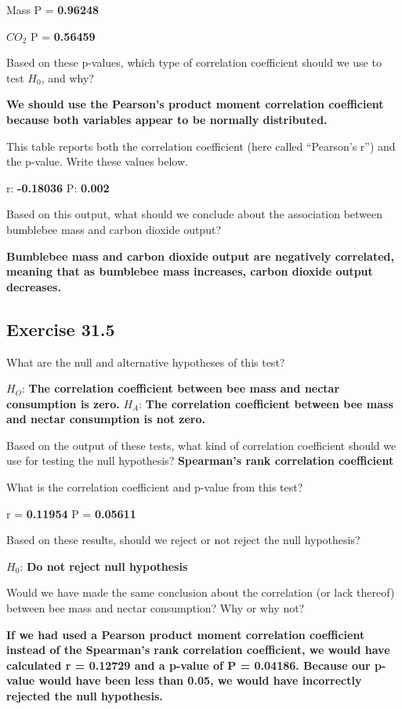 \documentclass[
  openany]{krantz}
\begin{document}
Mass P = \textbf{0.96248}

\(CO_2\) P = \textbf{0.56459}

Based on these p-values, which type of correlation coefficient should we use to test \(H_{0}\), and why?

\textbf{We should use the Pearson's product moment correlation coefficient because both variables appear to be normally distributed.}

This table reports both the correlation coefficient (here called ``Pearson's r'') and the p-value. Write these values below.

r: \textbf{-0.18036}
P: \textbf{0.002}

Based on this output, what should we conclude about the association between bumblebee mass and carbon dioxide output?

\textbf{Bumblebee mass and carbon dioxide output are negatively correlated, meaning that as bumblebee mass increases, carbon dioxide output decreases.}

\hypertarget{exercise-31.5}{%
\subsection{Exercise 31.5}\label{exercise-31.5}}

What are the null and alternative hypotheses of this test?

\(H_{O}\): \textbf{The correlation coefficient between bee mass and nectar consumption is zero.}
\(H_{A}\): \textbf{The correlation coefficient between bee mass and nectar consumption is not zero.}

Based on the output of these tests, what kind of correlation coefficient should we use for testing the null hypothesis? \textbf{Spearman's rank correlation coefficient}

What is the correlation coefficient and p-value from this test?

r = \textbf{0.11954}
P = \textbf{0.05611}

Based on these results, should we reject or not reject the null hypothesis?

\(H_{0}\): \textbf{Do not reject null hypothesis}

Would we have made the same conclusion about the correlation (or lack thereof) between bee mass and nectar consumption? Why or why not?

\textbf{If we had used a Pearson product moment correlation coefficient instead of the Spearman's rank correlation coefficient, we would have calculated r = 0.12729 and a p-value of P = 0.04186. Because our p-value would have been less than 0.05, we would have incorrectly rejected the null hypothesis.}
\end{document}
